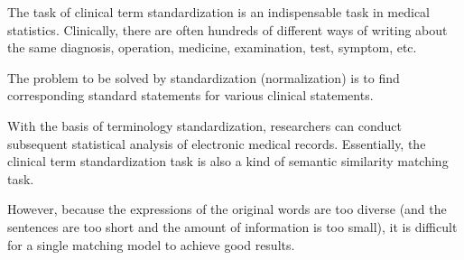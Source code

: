 
The task of clinical term standardization is an indispensable task in medical statistics. Clinically, there are often hundreds of different ways of writing about the same diagnosis, operation, medicine, examination, test, symptom, etc.

The problem to be solved by standardization (normalization) is to find corresponding standard statements for various clinical statements.

With the basis of terminology standardization, researchers can conduct subsequent statistical analysis of electronic medical records. Essentially, the clinical term standardization task is also a kind of semantic similarity matching task.

However, because the expressions of the original words are too diverse (and the sentences are too short and the amount of information is too small), it is difficult for a single matching model to achieve good results.













